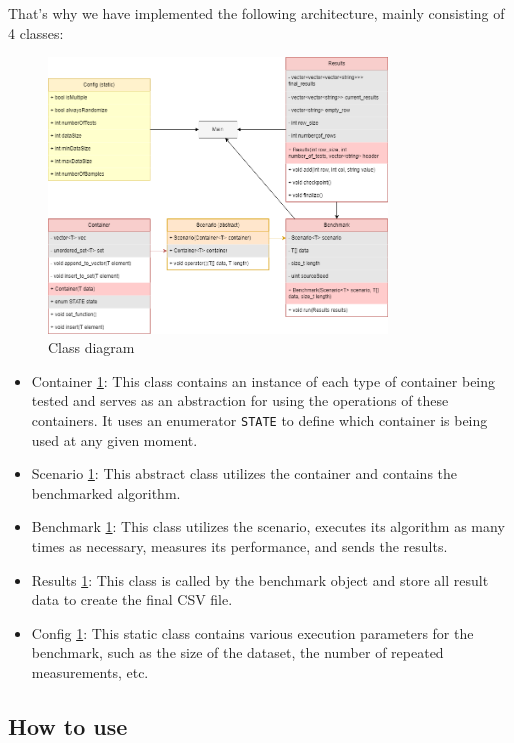 \documentclass[conference]{IEEEtran} \IEEEoverridecommandlockouts
\def\code#1{\texttt{#1}}
\begin{document}
That's why we have implemented the following architecture, mainly
consisting of 4 classes:

\begin{figure}[!h]
	\includegraphics[width=9cm]{Diagram/architecture.png}
	\caption{Class diagram}
	\label{class diagram}
\end{figure}

\begin{itemize}
	\item Container \ref{class diagram}: This class contains an
          instance of each type of container being tested and serves
          as an abstraction for using the operations of these
          containers. It uses an enumerator \code{STATE} to define
          which container is being used at any given moment.
	\item Scenario \ref{class diagram}: This abstract class
          utilizes the container and contains the benchmarked
          algorithm.
	\item Benchmark \ref{class diagram}: This class utilizes the
          scenario, executes its algorithm as many times as necessary,
          measures its performance, and sends the results.
	\item Results \ref{class diagram}: This class is called by the
          benchmark object and store all result data to create the
          final CSV file.
	\item Config \ref{class diagram}: This static class contains
          various execution parameters for the benchmark, such as the
          size of the dataset, the number of repeated measurements,
          etc.
\end{itemize}

\subsection{How to use}
\end{document}
